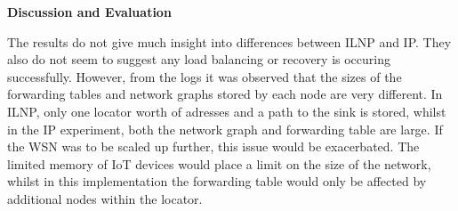 \documentclass[12pt]{article}
\begin{document}
\medskip
\noindent\textbf{Discussion and Evaluation}

\noindent The results do not give much insight into differences between ILNP and IP. They also do not seem to suggest any load balancing or recovery is occuring successfully. However, from the logs it was observed that the sizes of the forwarding tables and network graphs stored by each node are very different. In ILNP, only one locator worth of adresses and a path to the sink is stored, whilst in the IP experiment, both the network graph and forwarding table are large. If the WSN was to be scaled up further, this issue would be exacerbated. The limited memory of IoT devices would place a limit on the size of the network, whilst in this implementation the forwarding table would only be affected by additional nodes within the locator. 
\end{document}

